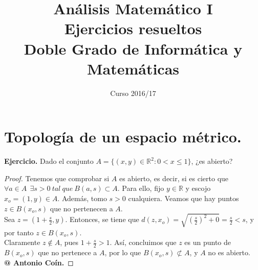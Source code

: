 \documentclass[11pt,a4paper, titlepage]{article}
\title{\textbf{Análisis Matemático I}\\ Ejercicios resueltos\\ \vspace{2em}\large{Doble Grado de Informática y Matemáticas}}
\author{}
\date{\vspace{-5em}Curso 2016/17}
\theoremstyle{plain}
\theoremstyle{remark}
\theoremstyle{definition}
\begin{document}
\maketitle


\section{Topología de un espacio métrico.}

\textbf{Ejercicio.} Dado el conjunto $A = \{ (x,y)\in \mathbb{R}^2: 0 < x \le 1 \}$, ¿es abierto?

\begin{proof}
Tenemos que comprobar si $A$ es abierto, es decir, si es cierto que\\
$\forall a \in A \ \ \exists s>0\ tal\ que\ B(a,s)\subset A$. Para ello, fijo $y \in \mathbb{R}$ y escojo $x_o = (1,y) \in A$. Además, tomo $s>0$ cualquiera. Veamos que hay puntos $z \in B(x_o, s)$ que no pertenecen a $A$.\\

Sea $\displaystyle z = (1 + \frac{s}{2}, y)$. Entonces, se tiene que $\displaystyle d(z,x_o)= \sqrt{\left(\frac{s}{2}\right)^2 + 0} = \frac{s}{2} < s$, y por tanto $z \in B(x_o,s)$.\\

Claramente $z\notin A$, pues $\displaystyle 1 + \frac{s}{2} > 1$. Así, concluimos que $z$ es un punto de $B(x_o,s)$ que no pertenece a $A$, por lo que $\displaystyle B(x_o,s) \not \subset A$, y $A$ no es abierto.\\

\textbf{@ Antonio Coín.}

\end{proof}
\end{document}
